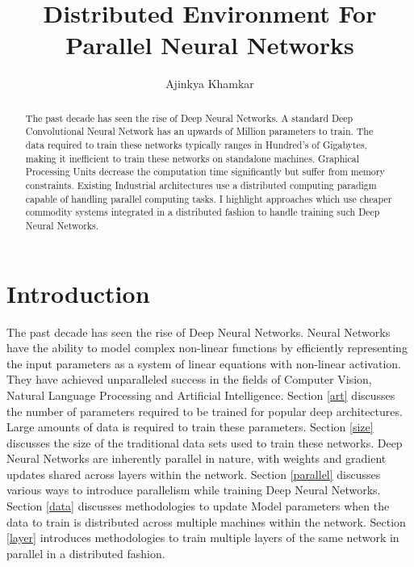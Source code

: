 \documentclass[sigconf]{acmart}
\begin{document}
\title{Distributed Environment For Parallel Neural Networks}


\author{Ajinkya Khamkar}

\renewcommand{\shortauthors}{B. Trovato et al.}


\begin{abstract}
The past decade has seen the rise of Deep Neural Networks. A standard Deep Convolutional Neural Network has an upwards of Million parameters to train. The data required to train these networks typically ranges in Hundred's of Gigabytes, making it inefficient to train these networks on standalone machines. Graphical Processing Units decrease the computation time significantly but suffer from memory constraints. Existing Industrial architectures use a distributed computing paradigm capable of handling parallel computing tasks. I highlight approaches which use cheaper commodity systems integrated in a distributed fashion to handle training such Deep Neural Networks.
\end{abstract}



\maketitle

\section{Introduction}

The past decade has seen the rise of Deep Neural Networks. Neural Networks have the ability to model complex non-linear functions by efficiently representing the input parameters as a system of linear equations with non-linear activation. They have achieved unparalleled success in the fields of Computer Vision, Natural Language Processing and Artificial Intelligence. Section \ref{art} discusses the number of parameters required to be trained for popular deep architectures. Large amounts of data is required to train these parameters. Section \ref{size} discusses the size of the traditional data sets used to train these networks. Deep Neural Networks are inherently parallel in nature, with weights and gradient updates shared across layers within the network. Section \ref{parallel} discusses various ways to introduce parallelism while training Deep Neural Networks. Section \ref{data} discusses methodologies to update Model parameters when the data to train is distributed across multiple machines within the network.  Section \ref{layer} introduces methodologies to train multiple layers of the same network in parallel in a distributed fashion. 
\end{document}

